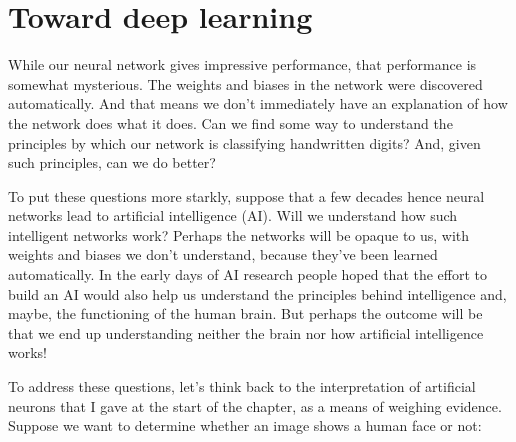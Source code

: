 \documentclass[a4paper,twoside,10pt]{book}
\begin{document}
\section{Toward deep learning}
While our neural network gives impressive performance, that performance is somewhat mysterious. The weights and biases in the network were discovered automatically. And that means we don't immediately have an explanation of how the network does what it does. Can we find some way to understand the principles by which our network is classifying handwritten digits? And, given such principles, can we do better?

To put these questions more starkly, suppose that a few decades hence neural networks lead to artificial intelligence (AI). Will we understand how such intelligent networks work? Perhaps the networks will be opaque to us, with weights and biases we don't understand, because they've been learned automatically. In the early days of AI research people hoped that the effort to build an AI would also help us understand the principles behind intelligence and, maybe, the functioning of the human brain. But perhaps the outcome will be that we end up understanding neither the brain nor how artificial intelligence works!

To address these questions, let's think back to the interpretation of artificial neurons that I gave at the start of the chapter, as a means of weighing evidence. Suppose we want to determine whether an image shows a human face or not:
\end{document}
